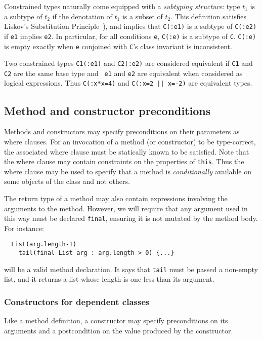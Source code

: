 Constrained types naturally come equipped with a {\em subtyping
structure}: type $t_1$ is a subtype of $t_2$ if the denotation of
$t_1$ is a subset of $t_2$. This definition satisfies
Liskov's Substitution Principle~\cite{liskov-behaviors}),
and implies that
{\tt C(:e1)} is a subtype of {\tt C(:e2)} if {\tt e1} implies {\tt e2}.
In particular, for all conditions {\tt e},
{\tt C(:e)} is a subtype of {\tt C}.
{\tt C(:e)} is empty exactly
when {\tt e} conjoined with {\tt C}'s class invariant is inconsistent.

Two constrained types {\tt C1(:e1)} and {\tt C2(:e2)} are considered
equivalent if {\tt C1} and {\tt C2} are the same base type and {\tt
e1} and {\tt e2} are equivalent when considered as logical
expressions. Thus {\tt C(:x*x=4)} and {\tt C(:x=2 || x=-2)} are
equivalent types.

\subsection{Method and constructor preconditions}

Methods and constructors may specify preconditions on their parameters
as where clauses.  For an invocation of a method (or constructor) to
be type-correct, the associated where clause must be statically known
to be satisfied. Note that the where clause may contain constraints on
the properties of {\tt this}. Thus the where clause may be used to
specify that a method is {\em conditionally} available on some objects
of the class and not others.

The
return type of a method may also contain expressions involving the
arguments to the method. However, we will require
that any argument used in this way must be declared {\tt final},
ensuring it is not mutated by the method body.
For instance:
\begin{verbatim}
  List(arg.length-1)
    tail(final List arg : arg.length > 0) {...}
\end{verbatim}
\noindent will be a valid method declaration. It says that
{\tt tail} must be passed a non-empty list, and it returns a list
whose length is one less than its argument.

\subsubsection{Constructors for dependent classes}

Like a method definition,
a constructor may
specify preconditions on its arguments
and a postcondition on the value produced by the constructor.

